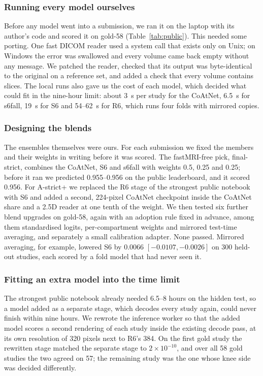 \subsubsection{Running every model ourselves} Before any model went into a submission, we ran it on the laptop with its author's code and scored it on gold-58 (Table~\ref{tab:public}). This needed some porting. One fast DICOM reader used a system call that exists only on Unix; on Windows the error was swallowed and every volume came back empty without any message. We patched the reader, checked that its output was byte-identical to the original on a reference set, and added a check that every volume contains slices. The local runs also gave us the cost of each model, which decided what could fit in the nine-hour limit: about 3~s per study for the CoAtNet, 6.5~s for s6fall, 19~s for S6 and 54--62~s for R6, which runs four folds with mirrored copies.

\subsubsection{Designing the blends} The ensembles themselves were ours. For each submission we fixed the members and their weights in writing before it was scored. The fastMRI-free pick, final-strict, combines the CoAtNet, S6 and s6fall with weights 0.5, 0.25 and 0.25; before it ran we predicted 0.955--0.956 on the public leaderboard, and it scored 0.956. For A-strict+ we replaced the R6 stage of the strongest public notebook with S6 and added a second, 224-pixel CoAtNet checkpoint inside the CoAtNet share and a 2.5D reader at one tenth of the weight. We then tested six further blend upgrades on gold-58, again with an adoption rule fixed in advance, among them standardised logits, per-compartment weights and mirrored test-time averaging, and separately a small calibration adapter. None passed. Mirrored averaging, for example, lowered S6 by 0.0066 $[-0.0107, -0.0026]$ on 300 held-out studies, each scored by a fold model that had never seen it.

\subsubsection{Fitting an extra model into the time limit} The strongest public notebook \cite{goodpjw_coatnet_nb} already needed 6.5--8 hours on the hidden test, so a model added as a separate stage, which decodes every study again, could never finish within nine hours. We rewrote the inference worker so that the added model scores a second rendering of each study inside the existing decode pass, at its own resolution of 320 pixels next to R6's 384. On the first gold study the rewritten stage matched the separate stage to $2\times10^{-10}$, and over all 58 gold studies the two agreed on 57; the remaining study was the one whose knee side was decided differently.


